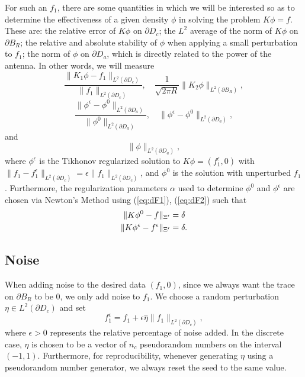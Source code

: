 \documentclass[11pt]{amsart}
\theoremstyle{definition}
\theoremstyle{definition}
\theoremstyle{definition}
\begin{document}
For such an $f_{1}$, there are some quantities in which we will be interested so as to determine the effectiveness of a given density $\phi$ in solving the problem $K\phi =f$. These are: the relative error of $K\phi$ on $\partial D_{c}$; the $L^{2}$ average of the norm of $K\phi$ on $\partial B_{R}$; the relative and absolute stability of $\phi$ when applying a small perturbation to $f_{1}$; the norm of $\phi$ on $\partial D_{a}$, which is directly related to the power of the antenna. In other words, we will measure
\begin{equation}
\frac{\|K_{1} \phi - f_{1}\|_{L^{2}(\partial D_{c})}}{\|f_{1}\|_{L^{2}(\partial D_{c})}}, \quad \frac{1}{\sqrt{2\pi R}} \|K_{2}\phi\|_{L^{2}(\partial B_{R})}, \label{eq:computevar1}
\end{equation}
\begin{equation}
\frac{\|\phi^{\epsilon}- \phi^{0}\|_{L^{2}(\partial D_{a})}}{\|\phi^{0}\|_{L^{2}(\partial D_{a})}}, \quad \|\phi^{\epsilon} - \phi^{0}\|_{L^{2}(\partial D_{a})}, \label{eq:computevar2}
\end{equation}
and
\begin{equation}
\|\phi\|_{L^{2}(\partial D_{a})}, \label{eq:phinorm}
\end{equation}
where $\phi^{\epsilon}$ is the Tikhonov regularized solution to $K\phi = (f_{1}^{\epsilon},0)$ with $\|f_{1} - f_{1}^{\epsilon}\|_{L^{2}(\partial D_{c})} = \epsilon \|f_{1}\|_{L^{2}(\partial D_{c})}$, and $\phi^{0}$ is the solution with unperturbed $f_{1}$. Furthermore, the regularization parameters $\alpha$ used to determine $\phi^{0}$ and $\phi^{\epsilon}$ are chosen via Newton's Method using (\ref{eq:dF1}), (\ref{eq:dF2}) such that 
\begin{align}
\|K\phi^{0} - f\|_{\Xi'} & = \delta \notag\\
\|K\phi^{\epsilon} - f^{\epsilon}\|_{\Xi'} & = \delta.
\end{align}

\subsection{Noise}
When adding noise to the desired data $(f_{1}, 0)$, since we always want the trace on $\partial B_{R}$ to be $0$, we only add noise to $f_{1}$. We choose a random perturbation $\eta \in L^{2}(\partial D_{c})$ and set
\begin{equation}
f_{1}^{\epsilon} = f_{1} + \epsilon \widehat{\eta} \|f_{1}\|_{L^{2}(\partial D_{c})}, \label{eq:noiseterm}
\end{equation}
where $\epsilon > 0$ represents the relative percentage of noise added. In the discrete case, $\eta$ is chosen to be a vector of $n_{c}$ pseudorandom numbers on the interval $(-1,1)$. Furthermore, for reproducibility, whenever generating $\eta$ using a pseudorandom number generator, we always reset the seed to the same value.
\end{document}
